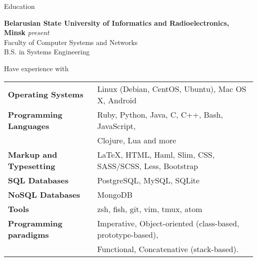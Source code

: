 \documentclass{resume} %
\begin{document}

\begin{rSection}{Education}

{\bf Belarusian State University of Informatics and Radioelectronics, Minsk} \hfill {\em  present} \\
Faculty of Computer Systems and Networks \\
B.S. in Systems Engineering \\

\end{rSection}


\begin{rSection}{Have experience with}

\begin{tabular}{ @{} >{\bfseries}l @{\hspace{6ex}} l }
Operating Systems     & Linux (Debian, CentOS, Ubuntu), Mac OS X, Android \\
Programming Languages & Ruby, Python, Java, C, C++, Bash, JavaScript,  \\
                      & Clojure, Lua and more\smallskip \\
Markup and Typesetting & \LaTeX, HTML, Haml, Slim, CSS, SASS/SCSS, Less, Bootstrap \smallskip \\
SQL Databases & PostgreSQL, MySQL, SQLite \smallskip \\
NoSQL Databases & MongoDB \smallskip \\
Tools & zsh, fish, git, vim, tmux, atom \smallskip \\
Programming paradigms & Imperative, Object-oriented (class-based, prototype-based), \\
                      & Functional, Concatenative (stack-based).
\end{tabular}

\end{rSection}

\end{document}
